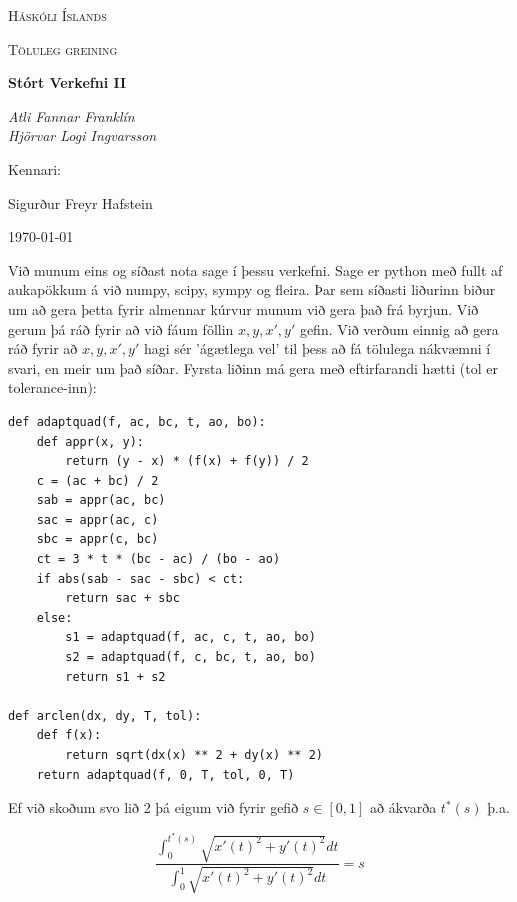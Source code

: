 \documentclass{article}
\begin{document}
\begin{titlepage}
	\centering
	{\scshape\LARGE Háskóli Íslands \par}
	\vspace{1cm}
	{\scshape\Large Töluleg greining \par}
	\vspace{1.5cm}
	{\huge\bfseries Stórt Verkefni II \par}
	\vspace{2cm}
	{\Large\itshape Atli Fannar Franklín \\ Hjörvar Logi Ingvarsson \par}
	\vfill
	Kennari: \par
	Sigurður Freyr Hafstein \par 

	\vfill

	{\large \today\par}
\end{titlepage}

Við munum eins og síðast nota sage í þessu verkefni. Sage er python með fullt af aukapökkum á við numpy, scipy, sympy og fleira. Þar sem síðasti liðurinn biður um að gera þetta fyrir almennar kúrvur munum við gera það frá byrjun. Við gerum þá ráð fyrir að við fáum föllin $x, y, x', y'$ gefin. Við verðum einnig að gera ráð fyrir að $x, y, x', y'$ hagi sér 'ágætlega vel' til þess að fá tölulega nákvæmni í svari, en meir um það síðar. Fyrsta liðinn má gera með eftirfarandi hætti (tol er tolerance-inn): \\

\begin{verbatim}
def adaptquad(f, ac, bc, t, ao, bo):
    def appr(x, y):
        return (y - x) * (f(x) + f(y)) / 2
    c = (ac + bc) / 2
    sab = appr(ac, bc)
    sac = appr(ac, c)
    sbc = appr(c, bc)
    ct = 3 * t * (bc - ac) / (bo - ao)
    if abs(sab - sac - sbc) < ct:
        return sac + sbc
    else:
        s1 = adaptquad(f, ac, c, t, ao, bo)
        s2 = adaptquad(f, c, bc, t, ao, bo)
        return s1 + s2

def arclen(dx, dy, T, tol):
    def f(x):
        return sqrt(dx(x) ** 2 + dy(x) ** 2)
    return adaptquad(f, 0, T, tol, 0, T)
\end{verbatim}

\vspace*{0.5cm}

Ef við skoðum svo lið 2 þá eigum við fyrir gefið $s \in [0, 1]$ að ákvarða $t^*(s)$ þ.a. 

\[\frac{\int_0^{t^*(s)} \sqrt{x'(t)^2 + y'(t)^2}dt}{\int_0^1 \sqrt{x'(t)^2 + y'(t)^2}dt} = s\]
\end{document}
